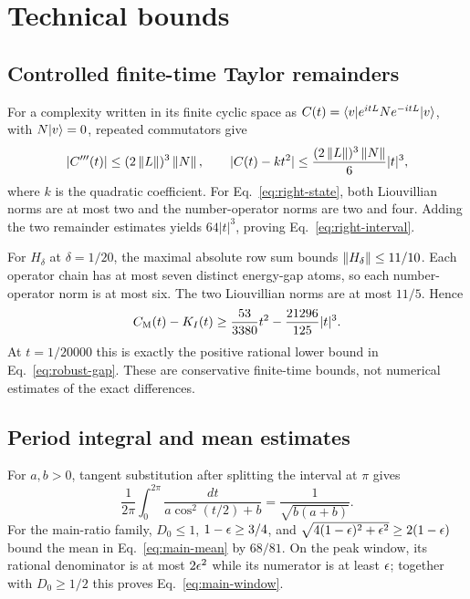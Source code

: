 \section{Technical bounds}\label{app:technical}
\subsection{Controlled finite-time Taylor remainders}
For a complexity written in its finite cyclic space as
$C(t)=\langle v\rvert e^{itL}N e^{-itL}\lvert v\rangle$, with $N\lvert v\rangle=0$, repeated
commutators give
\begin{equation}\label{eq:taylor-norm}
 |C'''(t)|\le(2\left\lVert L\right\rVert)^3\left\lVert N\right\rVert,\qquad
 |C(t)-kt^2|\le\frac{(2\left\lVert L\right\rVert)^3\left\lVert N\right\rVert}{6}|t|^3,
\end{equation}
where $k$ is the quadratic coefficient. For Eq.~\eqref{eq:right-state},
both Liouvillian norms are at most two and the number-operator norms are
two and four. Adding the two remainder estimates yields $64|t|^3$,
proving Eq.~\eqref{eq:right-interval}.

For $H_\delta$ at $\delta=1/20$, the maximal absolute row sum bounds
$\left\lVert H_\delta\right\rVert\le11/10$. Each operator chain has at most seven
distinct energy-gap atoms, so each number-operator norm is at most six.
The two Liouvillian norms are at most $11/5$. Hence
\begin{equation}\label{eq:perturbed-remainder}
 C_{\mathrm M}(t)-K_I(t)
 \ge\frac{53}{3380}t^2-\frac{21296}{125}|t|^3.
\end{equation}
At $t=1/20000$ this is exactly the positive rational lower bound in
Eq.~\eqref{eq:robust-gap}. These are conservative finite-time bounds,
not numerical estimates of the exact differences.

\subsection{Period integral and mean estimates}
For $a,b>0$, tangent substitution after splitting the interval at $\pi$
gives
\begin{equation}\label{eq:integral}
 \frac1{2\pi}\int_0^{2\pi}
 \frac{dt}{a\cos^2(t/2)+b}
 =\frac1{\sqrt{b(a+b)}}.
\end{equation}
For the main-ratio family, $D_0\le1$, $1-\epsilon\ge3/4$, and
$\sqrt{4(1-\epsilon)^2+\epsilon^2}\ge2(1-\epsilon)$ bound the mean in
Eq.~\eqref{eq:main-mean} by $68/81$. On the peak window, its rational
denominator is at most $2\epsilon^2$ while its numerator is at least
$\epsilon$; together with $D_0\ge1/2$ this proves
Eq.~\eqref{eq:main-window}.

